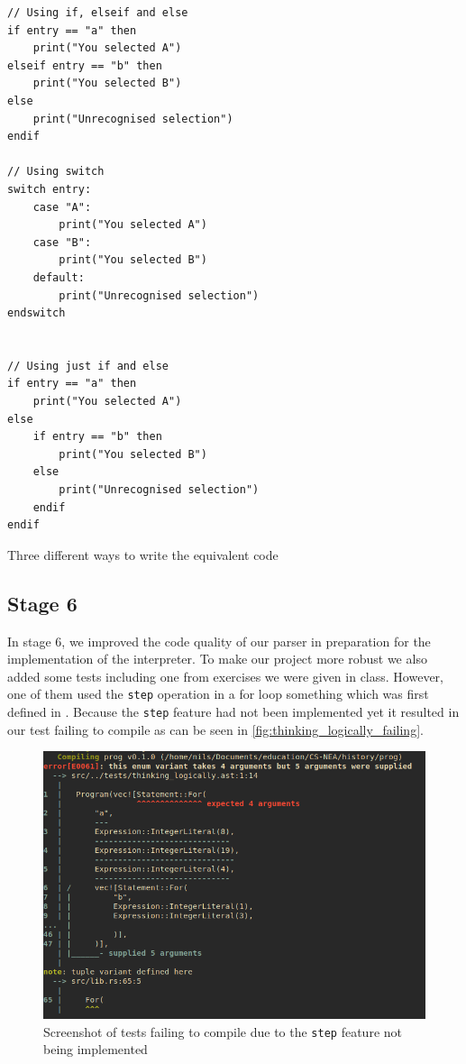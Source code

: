 \documentclass{article}
\begin{document}
\begin{listing}
	\begin{verbatim}
// Using if, elseif and else
if entry == "a" then
	print("You selected A")
elseif entry == "b" then
	print("You selected B")
else
	print("Unrecognised selection")
endif

// Using switch
switch entry:
	case "A":
		print("You selected A")
	case "B":
		print("You selected B")
	default:
		print("Unrecognised selection")
endswitch


// Using just if and else
if entry == "a" then
	print("You selected A")
else
	if entry == "b" then
		print("You selected B")
	else
		print("Unrecognised selection")
	endif
endif
	\end{verbatim}
	\caption{Three different ways to write the equivalent code}
	\label{lst:switch_tranformation}
\end{listing}

\subsection{Stage 6}

In stage 6, we improved the code quality of our parser in preparation for the
implementation of the interpreter. To make our project more robust we also
added some tests including one from exercises we were given in class. However,
one of them used the \texttt{step} operation in a for loop something which was
first defined in . Because the \texttt{step} feature had not
been implemented yet it resulted in our test failing to compile as can be seen
in \autoref{fig:thinking_logically_failing}.

\begin{figure}
	\includegraphics[width=\textwidth]{thinking_logically_failing}
	\caption{Screenshot of tests failing to compile due to the \texttt{step}
	feature not being implemented}
	\label{fig:thinking_logically_failing}
\end{figure}
\end{document}
